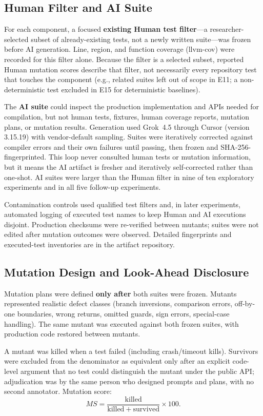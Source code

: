 \documentclass[10pt,conference,a4paper]{IEEEtran}
\begin{document}
\subsection{Human Filter and AI Suite}
For each component, a focused \textbf{existing Human test filter}---a researcher-selected subset of already-existing tests, not a newly written suite---was frozen before AI generation. Line, region, and function coverage (llvm-cov) were recorded for this filter alone. Because the filter is a selected subset, reported Human mutation scores describe that filter, not necessarily every repository test that touches the component (e.g., related suites left out of scope in E11; a non-deterministic test excluded in E15 for deterministic baselines).

The \textbf{AI suite} could inspect the production implementation and APIs needed for compilation, but not human tests, fixtures, human coverage reports, mutation plans, or mutation results. Generation used Grok~4.5 through Cursor (version 3.15.19) with vendor-default sampling. Suites were iteratively corrected against compiler errors and their own failures until passing, then frozen and SHA-256-fingerprinted. This loop never consulted human tests or mutation information, but it means the AI artifact is fresher and iteratively self-corrected rather than one-shot. AI suites were larger than the Human filter in nine of ten exploratory experiments and in all five follow-up experiments.

Contamination controls used qualified test filters and, in later experiments, automated logging of executed test names to keep Human and AI executions disjoint. Production checksums were re-verified between mutants; suites were not edited after mutation outcomes were observed. Detailed fingerprints and executed-test inventories are in the artifact repository.

\subsection{Mutation Design and Look-Ahead Disclosure}
Mutation plans were defined \textbf{only after} both suites were frozen. Mutants represented realistic defect classes (branch inversions, comparison errors, off-by-one boundaries, wrong returns, omitted guards, sign errors, special-case handling). The same mutant was executed against both frozen suites, with production code restored between mutants.

A mutant was killed when a test failed (including crash/timeout kills). Survivors were excluded from the denominator as equivalent only after an explicit code-level argument that no test could distinguish the mutant under the public API; adjudication was by the same person who designed prompts and plans, with no second annotator. Mutation score:
\begin{equation}
MS = \frac{\mathrm{killed}}{\mathrm{killed}+\mathrm{survived}}\times 100.
\end{equation}
\end{document}
